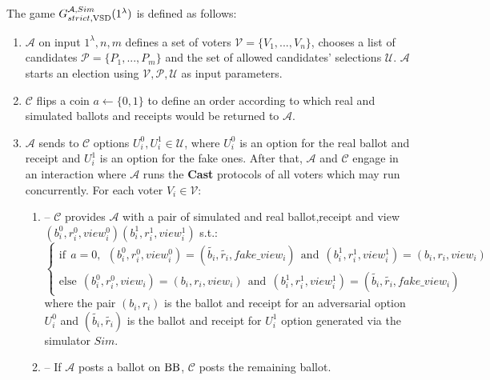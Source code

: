 The game $G_{strict, \operatorname{VSD}}^{\mathcal{A},Sim}(1^{\lambda})$ is defined as follows:
\begin{enumerate} 
\item $\mathcal{A}$ on input $1^{\lambda},n,m$ defines a set of voters  $\mathcal{V} = \{V_1,...,V_n\}$, chooses a list of candidates  $\mathcal{P} = \{P_1,...,P_m\}$ and the set of allowed candidates' selections $\mathcal{U}$.  $\mathcal{A}$ starts an election using $\mathcal{V}, \mathcal{P}, \mathcal{U}$ as input parameters.
\item $\mathcal{C}$ flips a coin $a \leftarrow \{0,1\}$ to define an order according to which real and simulated ballots and receipts would be returned to $\mathcal{A}$.
\item   $\mathcal{A}$ sends to  $\mathcal{C}$ options $U_i^0, U_i^1 \in  \mathcal{U}$, where $U_i^0$ is an option for the real ballot and receipt and $U_i^1$ is an option for the fake ones.  After that, $\mathcal{A}$ and $\mathcal{C}$ engage in an interaction where $\mathcal{A}$ runs the \textbf{Cast} protocols of all voters which may run concurrently. For each voter $V_i \in \mathcal{V}$: 
\begin{enumerate}
\item[] -- $\mathcal{C}$  provides $\mathcal{A}$ with a pair of simulated and real ballot,receipt and view\\$(b_i^0, r_i^0,view_i^0) (b_i^1, r_i^1,view_i^1)$ s.t.:\\
$ \begin{cases}
 \text{if} ~~a =0,~~ (b_i^0,r_i^0,view_i^0) = (\tilde{b_i},\tilde{r_i},fake\_view_i) ~~ \text{and} ~~  (b_i^1,r_i^1,view_i^1) = (b_i,r_i,view_i)   \\ 
 \text{else}~~ (b_i^0,r_i^0,view_i) =(b_i,r_i,view_i)~~  \text{and} ~~  (b_i^1,r_i^1,view_i^1) =(\tilde{b_i},\tilde{r_i},fake\_view_i)
\end{cases}$\\ 
where the pair $(b_i, r_i)$ is the ballot and receipt for an adversarial option $U_i^0$ and $(\tilde{b_i},\tilde{r_i})$ is the ballot and receipt for  $U_i^1$ option generated via the simulator $Sim$.
\item[] --  If  $\mathcal{A}$ posts a ballot on $\operatorname{BB}$, $\mathcal{C}$ posts the remaining ballot. 
\end{enumerate}

\end{enumerate}
